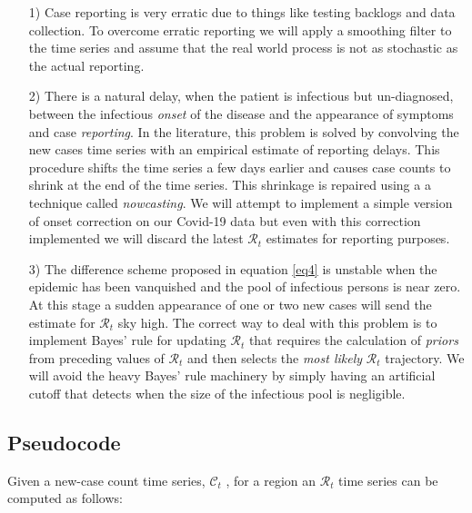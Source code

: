 \documentclass[11pt]{article}
\begin{document}
\begin{itemize}
\item[1)] Case reporting is very erratic due to things like testing backlogs and data collection. 
To overcome erratic reporting we will apply a smoothing filter to the time series and
assume that the real world process is not as stochastic as the actual reporting.
\item[2)] There is a natural delay, when the patient is infectious but un-diagnosed, 
between the infectious {\it onset} of the disease and the appearance of symptoms
and case {\it reporting}. 
In the literature, this problem is solved by convolving the new cases time series
with an empirical estimate of reporting delays. This procedure shifts the time series
a few days earlier and causes case counts to shrink at the end of the time series.
This shrinkage is repaired using a a technique called {\it nowcasting}. 
We will attempt to implement a simple version of onset correction 
on our Covid-19 data but even with this correction implemented we will discard
the latest $\mathcal{R}_t$ estimates for reporting purposes.
\item[3)]
The difference scheme proposed in equation \ref{eq4} is unstable when the
epidemic has been vanquished and the pool of infectious persons is near zero.
At this stage a sudden appearance of one or two new cases will send the
estimate for $\mathcal{R}_t$ sky high. The correct way to deal with this
problem is to implement Bayes' rule for updating $\mathcal{R}_t$ that requires
the calculation of {\it priors} from preceding values of $\mathcal{R}_t$ and then
selects the {\it most likely} $\mathcal{R}_t$ trajectory. We will avoid the
heavy Bayes' rule machinery by simply having an artificial cutoff that detects
when the size of the infectious pool is negligible.
\end{itemize}

\subsection{Pseudocode}

Given a new-case count time series, $\mathcal{C}_t$ , for a region an $\mathcal{R}_t$ 
time series can be computed as follows:
\end{document}
